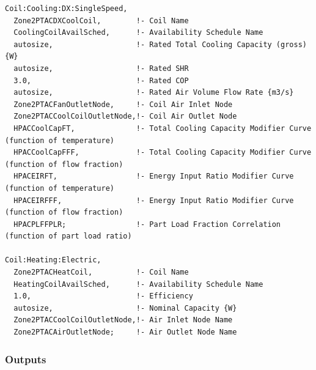 \begin{lstlisting}
Coil:Cooling:DX:SingleSpeed,
  Zone2PTACDXCoolCoil,        !- Coil Name
  CoolingCoilAvailSched,      !- Availability Schedule Name
  autosize,                   !- Rated Total Cooling Capacity (gross) {W}
  autosize,                   !- Rated SHR
  3.0,                        !- Rated COP
  autosize,                   !- Rated Air Volume Flow Rate {m3/s}
  Zone2PTACFanOutletNode,     !- Coil Air Inlet Node
  Zone2PTACCoolCoilOutletNode,!- Coil Air Outlet Node
  HPACCoolCapFT,              !- Total Cooling Capacity Modifier Curve (function of temperature)
  HPACCoolCapFFF,             !- Total Cooling Capacity Modifier Curve (function of flow fraction)
  HPACEIRFT,                  !- Energy Input Ratio Modifier Curve (function of temperature)
  HPACEIRFFF,                 !- Energy Input Ratio Modifier Curve (function of flow fraction)
  HPACPLFFPLR;                !- Part Load Fraction Correlation (function of part load ratio)

Coil:Heating:Electric,
  Zone2PTACHeatCoil,          !- Coil Name
  HeatingCoilAvailSched,      !- Availability Schedule Name
  1.0,                        !- Efficiency
  autosize,                   !- Nominal Capacity {W}
  Zone2PTACCoolCoilOutletNode,!- Air Inlet Node Name
  Zone2PTACAirOutletNode;     !- Air Outlet Node Name
\end{lstlisting}

\subsubsection{Outputs}\label{outputs-7-012}


